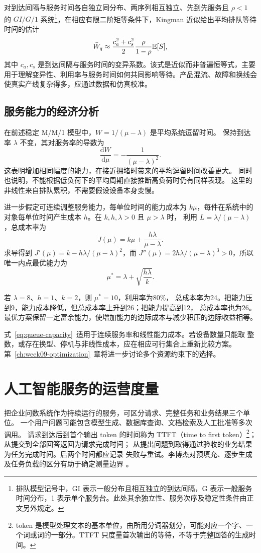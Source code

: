 对到达间隔与服务时间各自独立同分布、两序列相互独立、先到先服务且 \(\rho<1\) 的 \(GI/G/1\) 系统\footnote{排队模型记号中，GI 表示一般分布且相互独立的到达间隔，G 表示一般服务时间分布，1 表示单个服务台。此处其余独立性、服务次序及稳定性条件由正文另外规定。}，在相应有限二阶矩等条件下，Kingman 近似给出平均排队等待时间的估计
\[
\bar W_q\approx
\frac{c_a^2+c_s^2}{2}\frac{\rho}{1-\rho}\mathbb E[S],
\]
其中 \(c_a,c_s\) 是到达间隔与服务时间的变异系数。该式是近似而非普遍恒等式，主要用于理解变异性、利用率与服务时间如何共同影响等待。产品混流、故障和换线会使真实产线复杂得多，应通过数据和仿真校准。

\subsection{服务能力的经济分析}
\label{sec:queue-cost}
在前述稳定 M/M/1 模型中，\(W=1/(\mu-\lambda)\) 是平均系统逗留时间。
保持到达率 \(\lambda\) 不变，其对服务率的导数为
\[
\frac{\mathrm dW}{\mathrm d\mu}=-\frac1{(\mu-\lambda)^2}.
\]
这表明增加相同幅度的能力，在接近拥堵时带来的平均逗留时间改善更大。
同时也说明，不能根据低负荷下的平均周期直接推断高负荷时仍有同样表现。
这里的非线性来自排队累积，不需要假设设备本身变慢。

进一步假定可连续调整服务能力，每单位时间的能力成本为 \(k\mu\)，每件在系统中的
对象每单位时间产生成本 \(h\)。在 \(k,h,\lambda>0\) 且 \(\mu>\lambda\) 时，
利用 \(L=\lambda/(\mu-\lambda)\)，总成本率为
\[
J(\mu)=k\mu+\frac{h\lambda}{\mu-\lambda}.
\]
求导得到 \(J'(\mu)=k-h\lambda/(\mu-\lambda)^2\)，而
\(J''(\mu)=2h\lambda/(\mu-\lambda)^3>0\)，所以唯一内点最优能力为
\begin{equation}
\mu^*=\lambda+\sqrt{\frac{h\lambda}{k}}.
\label{eq:queue-capacity}
\end{equation}

若 \(\lambda=8\)、\(h=1\)、\(k=2\)，则 \(\mu^*=10\)，利用率为80\%，
总成本率为24。把能力压到9，能力成本降低，但总成本率上升到26；把能力提高到12，
总成本率也为26。最优方案保留一定富余能力，使增加能力的边际成本与减少积压的边际收益相等。

式~\eqref{eq:queue-capacity}~适用于连续服务率和线性能力成本。若设备数量只能取
整数，或存在换型、停机与非线性成本，应在相应可行集合上重新比较方案。
第~\ref{ch:week09-optimization}~章将进一步讨论多个资源约束下的选择。

\section{人工智能服务的运营度量}
\label{sec:ai-service-operations}
把企业问数系统作为持续运行的服务，可区分请求、完整任务和业务结果三个单位。
一个用户问题可能包含模型生成、数据库查询、文档检索及人工批准等多次调用。
请求到达后到首个输出 token 的时间称为 TTFT（time to first token）\footnote{token 是模型处理文本的基本单位，由所用分词器划分，可能对应一个字、一个词或词的一部分。TTFT 只度量首次输出的等待，不等于完整回答的生成时间。}；从提交到全部回答返回为请求完成时间；
从提出问题到取得通过验收的业务结果为任务完成时间。后两个时间都应记录
失败与重试。李博杰对预填充、逐步生成及任务负载的区分有助于确定测量边界
\cite{aiinfra2026}。

